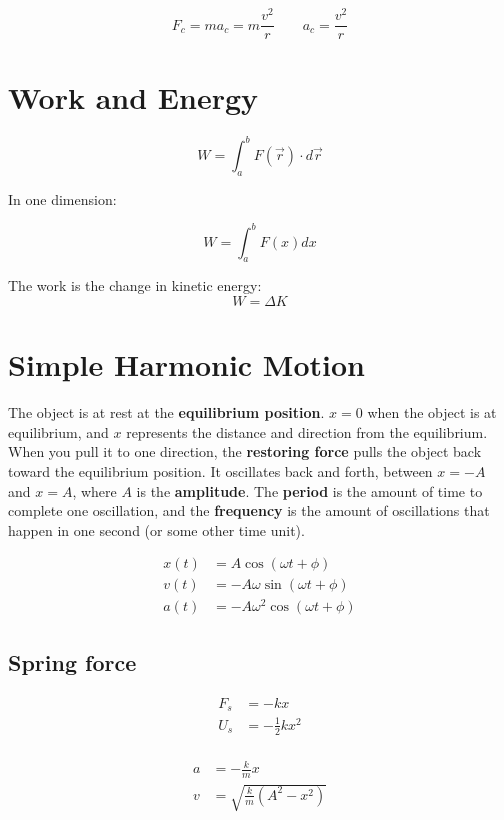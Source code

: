 \[
	F_c = ma_c = m \frac{v^2}{r} \qquad a_c = \frac{v^2}{r}
\]

\section{Work and Energy}

\[
	W = \int_a^b F(\vec{r}) \cdot d\vec{r}
\]

In one dimension:

\[
	W = \int_a^b F(x) dx
\]

\begin{namedtheorem} The work is the change in kinetic energy: 
	\[
		W = \Delta K
	\]
\end{namedtheorem}

\section{Simple Harmonic Motion}

The object is at rest at the \textbf{equilibrium position}. $x = 0$ when the object is at equilibrium, and $x$ represents the distance and direction from the equilibrium. When you pull it to one direction, the \textbf{restoring force} pulls the object back toward the equilibrium position. It oscillates back and forth, between $x = -A$ and $x = A$, where $A$ is the \textbf{amplitude}. The \textbf{period} is the amount of time to complete one oscillation, and the \textbf{frequency} is the amount of oscillations that happen in one second (or some other time unit).

\begin{align*}
	x(t) &= A \cos(\omega t + \phi) \\
	v(t) &= -A\omega \sin(\omega t + \phi) \\
	a(t) &= -A \omega^2 \cos(\omega t + \phi)
\end{align*}

\subsection{Spring force}

\begin{align*}
	F_s &= -kx \\
	U_s &= -\tfrac{1}{2} kx^2 \\
\end{align*}

\begin{align*}
	a &= - \frac{k}{m} x \\
	v &= \sqrt{\frac{k}{m} (A^2 - x^2)} \\
\end{align*}

